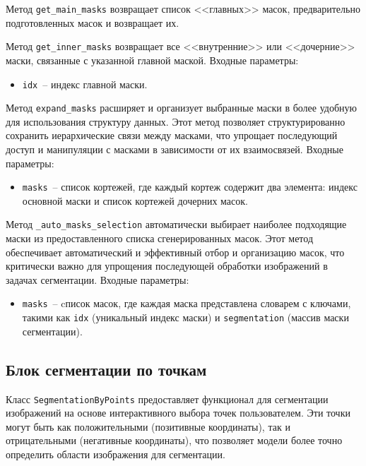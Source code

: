 Метод \lstinline{get_main_masks} возвращает список <<главных>> масок, предварительно подготовленных масок и возвращает их.

Метод \lstinline{get_inner_masks} возвращает все <<внутренние>> или <<дочерние>> маски, связанные с указанной главной маской. Входные параметры:

\begin{itemize}
    \item \lstinline{idx}~-- индекс главной маски.
\end{itemize}

Метод \lstinline{expand_masks} расширяет и организует выбранные маски в более удобную для использования структуру данных. Этот метод позволяет структурированно сохранить иерархические связи между масками, что упрощает последующий доступ и манипуляции с масками в зависимости от их взаимосвязей. Входные параметры:

\begin{itemize}
    \item \lstinline{masks}~-- список кортежей, где каждый кортеж содержит два элемента: индекс основной маски и список кортежей дочерних масок.
\end{itemize}

Метод \lstinline{_auto_masks_selection} автоматически выбирает наиболее подходящие маски из предоставленного списка сгенерированных масок. Этот метод обеспечивает автоматический и эффективный отбор и организацию масок, что критически важно для упрощения последующей обработки изображений в задачах сегментации. Входные параметры:

\begin{itemize}
    \item \lstinline{masks}~-- cписок масок, где каждая маска представлена словарем с ключами, такими как \lstinline{idx} (уникальный индекс маски) и  \lstinline{segmentation} (массив маски сегментации).
\end{itemize}

\subsection{Блок сегментации по точкам}

Класс \lstinline{SegmentationByPoints} предоставляет функционал для сегментации изображений на основе интерактивного выбора точек пользователем. Эти точки могут быть как положительными (позитивные координаты), так и отрицательными (негативные координаты), что позволяет модели более точно определить области изображения для сегментации.

